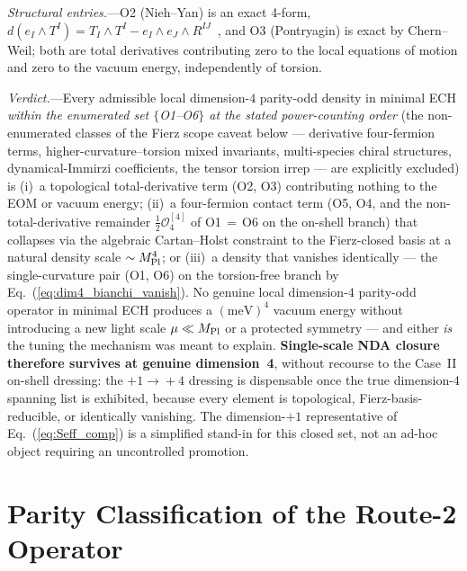 \documentclass[aps,prd,twocolumn,superscriptaddress,showpacs,preprintnumbers,nofootinbib,longbibliography,floatfix]{revtex4-2}
\newcommand{\MPl}{M_{\rm Pl}}
\begin{document}
\textit{Structural entries.}---O2 (Nieh--Yan) is an exact 4-form,
$d(e_I\wedge T^I)=T_I\wedge T^I-e_I\wedge e_J\wedge R^{IJ}$~\cite{NiehYan1982},
and O3 (Pontryagin) is exact by Chern--Weil; both are total derivatives
contributing zero to the local equations of motion and zero to the vacuum
energy, independently of torsion.

\textit{Verdict.}---Every admissible local dimension-$4$ parity-odd density in
minimal ECH \emph{within the enumerated set $\{$O1--O6$\}$ at the stated
power-counting order} (the non-enumerated classes of the Fierz scope caveat
below --- derivative four-fermion terms, higher-curvature--torsion mixed
invariants, multi-species chiral structures, dynamical-Immirzi coefficients,
the tensor torsion irrep --- are explicitly excluded) is
(i)~a topological total-derivative term (O2, O3) contributing
nothing to the EOM or vacuum energy; (ii)~a four-fermion contact term
(O5, O4, and the non-total-derivative remainder $\tfrac12\mathcal{O}_4^{[4]}$
of O1$\,=\,$O6 on the on-shell branch)
that collapses via the algebraic Cartan--Holst constraint to the
Fierz-closed basis
at a natural density scale $\sim\MPl^4$; or (iii)~a density that vanishes
identically --- the single-curvature pair (O1, O6) on the torsion-free
branch by Eq.~(\ref{eq:dim4_bianchi_vanish}). No genuine
local dimension-$4$ parity-odd operator in minimal ECH produces a
$(\text{meV})^4$ vacuum energy without introducing a new light scale
$\mu\ll\MPl$ or a protected symmetry --- and either \emph{is} the tuning the
mechanism was meant to explain. \textbf{Single-scale NDA closure therefore
survives at genuine dimension~4}, without recourse to the Case~II on-shell
dressing: the $+1\!\to\!+4$ dressing is dispensable once the true dimension-$4$
spanning list is exhibited, because every element is topological,
Fierz-basis-reducible, or identically vanishing. The dimension-$+1$ representative of Eq.~(\ref{eq:Seff_comp})
is a simplified stand-in for this closed set, not an ad-hoc object requiring an
uncontrolled promotion.

\section{Parity Classification of the Route-2 Operator}\label{app:parity}
\end{document}
